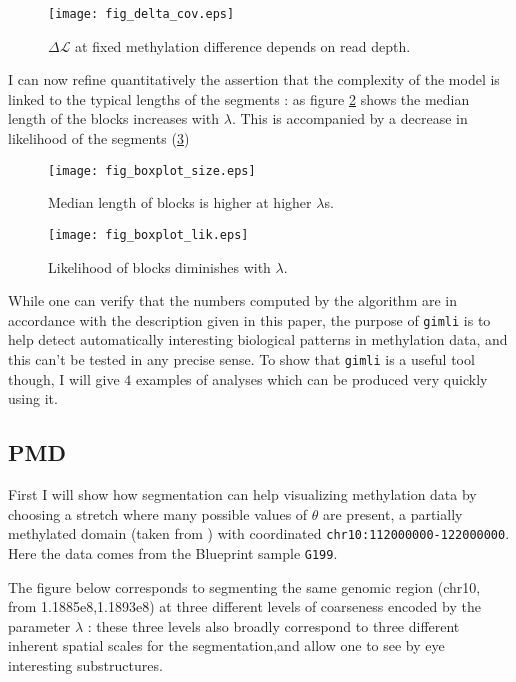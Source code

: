 \documentclass[12pt]{amsart}
\newcommand{\lik}{\ensuremath{\mathcal{L}}}
\newcommand{\gimli}{\texttt{gimli}}
\begin{document}
\begin{figure}\label{fig_delta_cov}
\texttt{[image: fig\_delta\_cov.eps]}
\caption{$\Delta  \lik$ at fixed methylation difference depends on read depth.}
\end{figure}

I can now refine quantitatively the assertion that the complexity of the model
is linked to the typical lengths of the segments : as figure \ref{fig_boxplot_size} 
shows the median length of the blocks increases with $\lambda$. This is 
accompanied by a decrease in likelihood of the segments (\ref{fig_boxplot_lik})

\begin{figure}\label{fig_boxplot_size}
\texttt{[image: fig\_boxplot\_size.eps]}
\caption{Median length of blocks is higher at higher $\lambda$s.}
\end{figure}

\begin{figure}\label{fig_boxplot_lik}
\texttt{[image: fig\_boxplot\_lik.eps]}
\caption{Likelihood of blocks diminishes with $\lambda$.}
\end{figure}

While one can verify that the numbers computed by the algorithm are in 
accordance with the description
given in this paper, the purpose of \gimli{} is to help 
detect automatically interesting biological patterns in methylation data, 
and this can't be tested in any 
precise sense. To show that \gimli{} is a useful tool
though, I will give $4$ examples of analyses which can be produced very quickly
using it. 

\subsection{PMD}

First I will show how segmentation can help visualizing methylation data by choosing
a stretch where many possible values of $\theta$ are present, a partially
methylated domain (taken from \cite{pmd}) with coordinated 
\texttt{chr10:112000000-122000000}. Here the data comes from the Blueprint sample \texttt{G199}. 

The figure below corresponds to segmenting the same genomic region (chr10, from 1.1885e8,1.1893e8) at 
three different levels of coarseness encoded by the parameter $\lambda$ : 
these three levels also broadly correspond to three different inherent spatial scales for the segmentation,and allow one to 
see by eye interesting substructures. 
\end{document}
